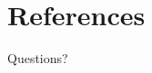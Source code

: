 \documentclass{beamer}
\begin{document}
\section{References}

\renewcommand*{\bibfont}{\tiny}
\frame[allowframebreaks]{\printbibliography}

\begin{frame}
    Questions?
\end{frame}
\end{document}

